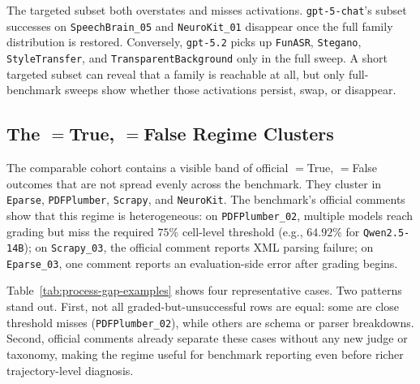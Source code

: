 

The targeted subset both overstates and misses activations.
\texttt{gpt-5-chat}'s subset successes on \texttt{SpeechBrain\_05} and
\texttt{NeuroKit\_01} disappear once the full family distribution is restored.
Conversely, \texttt{gpt-5.2} picks up \texttt{FunASR}, \texttt{Stegano},
\texttt{StyleTransfer}, and \texttt{TransparentBackground} only in the full
sweep. A short targeted subset can reveal that a family is reachable at all,
but only full-benchmark sweeps show whether those activations persist, swap, or
disappear.

\subsection{The \processmetric$=$True, \resultmetric$=$False Regime Clusters}

The comparable cohort contains a visible band of official
\processmetric$=$True, \resultmetric$=$False outcomes that are not spread
evenly across the benchmark. They cluster in \texttt{Eparse},
\texttt{PDFPlumber}, \texttt{Scrapy}, and \texttt{NeuroKit}. The benchmark's
official comments show that this regime is heterogeneous: on
\texttt{PDFPlumber\_02}, multiple models reach grading but miss the required
$75\%$ cell-level threshold (e.g., $64.92\%$ for \texttt{Qwen2.5-14B}); on
\texttt{Scrapy\_03}, the official comment reports XML parsing failure; on
\texttt{Eparse\_03}, one comment reports an evaluation-side error after grading
begins.



Table~\ref{tab:process-gap-examples} shows four representative cases. Two
patterns stand out. First, not all graded-but-unsuccessful rows are equal: some
are close threshold misses (\texttt{PDFPlumber\_02}), while others are schema
or parser breakdowns. Second, official comments already separate these cases
without any new judge or taxonomy, making the regime useful for benchmark
reporting even before richer trajectory-level diagnosis.

